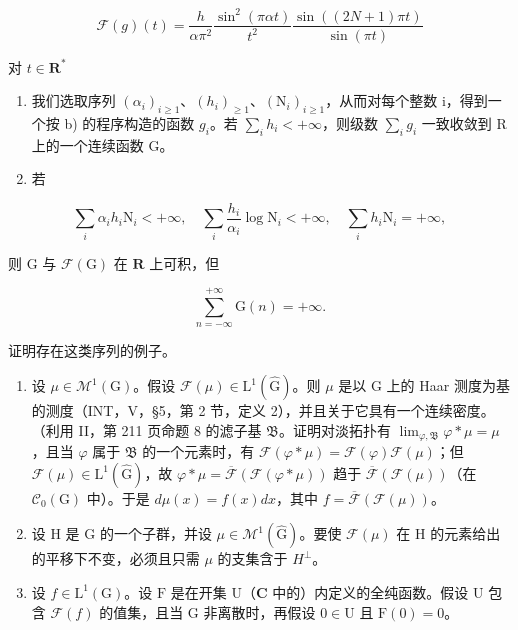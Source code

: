 \[
\mathcal {F} (g) (t) = \frac {h}{\alpha \pi^ {2}} \frac {\sin^ {2} (\pi \alpha t)}{t ^ {2}} \frac {\sin ((2 N + 1) \pi t)}{\sin (\pi t)}
\]

对 \(t\in \mathbf{R}^*\)

\begin{enumerate}
\def\labelenumi{\alph{enumi})}
\setcounter{enumi}{2}
\item
  我们选取序列 \((\alpha_{i})_{i\geqslant1}\)、\((h_{i})_{\geqslant1}\)、\((\mathrm{N}_{i})_{i\geqslant1}\)，从而对每个整数 i，得到一个按 b) 的程序构造的函数 \(g_{i}\)。若 \(\sum_{i} h_{i} < +\infty\)，则级数 \(\sum_{i} g_{i}\) 一致收敛到 R 上的一个连续函数 G。
\item
  若
\end{enumerate}

\[
\sum_ {i} \alpha_ {i} h _ {i} \mathrm{N} _ {i} <   + \infty , \quad \sum_ {i} \frac {h _ {i}}{\alpha_ {i}} \log \mathrm{N} _ {i} <   + \infty , \quad \sum_ {i} h _ {i} \mathrm{N} _ {i} = + \infty ,
\]

则 G 与 \(\mathcal{F}(\mathrm{G})\) 在 \(\mathbf{R}\) 上可积，但

\[
\sum_ {n = - \infty} ^ {+ \infty} \mathrm{G} (n) = + \infty .
\]

证明存在这类序列的例子。

\begin{enumerate}
\def\labelenumi{\arabic{enumi})}
\setcounter{enumi}{4}
\item
  设 \(\mu \in \mathcal{M}^1 (\mathrm{G})\)。假设 \(\mathcal{F}(\mu)\in \mathrm{L}^1 (\widehat{\mathrm{G}})\)。则 \(\mu\) 是以 G 上的 Haar 测度为基的测度（INT，V，§5，第 2 节，定义 2），并且关于它具有一个连续密度。（利用 II，第 211 页命题 8 的滤子基 \(\mathfrak{B}\)。证明对淡拓扑有 \(\lim_{\varphi ,\mathfrak{B}}\varphi *\mu = \mu\)，且当 \(\varphi\) 属于 \(\mathfrak{B}\) 的一个元素时，有 \(\mathcal{F}(\varphi *\mu) = \mathcal{F}(\varphi)\mathcal{F}(\mu)\)；但 \(\mathcal{F}(\mu)\in \mathrm{L}^1 (\widehat{\mathrm{G}})\)，故 \(\varphi *\mu = \overline{\mathcal{F}} (\mathcal{F}(\varphi *\mu))\) 趋于 \(\overline{\mathcal{F}} (\mathcal{F}(\mu))\)（在 \(\mathcal{C}_0(\mathrm{G})\) 中）。于是 \(d\mu (x) = f(x)dx\)，其中 \(f = \overline{\mathcal{F}} (\mathcal{F}(\mu))\)。
\item
  设 H 是 G 的一个子群，并设 \(\mu \in \mathcal{M}^{1}(\widehat{\mathrm{G}})\)。要使 \(\mathcal{F}(\mu)\) 在 H 的元素给出的平移下不变，必须且只需 \(\mu\) 的支集含于 \(H^{\perp}\)。
\item
  设 \(f \in \mathrm{L}^1(\mathrm{G})\)。设 \(\mathrm{F}\) 是在开集 \(\mathrm{U}\)（\(\mathbf{C}\) 中的）内定义的全纯函数。假设 \(\mathrm{U}\) 包含 \(\mathcal{F}(f)\) 的值集，且当 \(\mathrm{G}\) 非离散时，再假设 \(0 \in \mathrm{U}\) 且 \(\mathrm{F}(0) = 0\)。
\end{enumerate}

